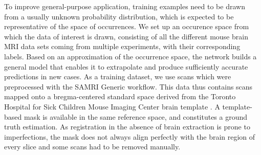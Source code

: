 To improve general-purpose application, training examples need to be drawn from a usually unknown probability distribution, which is expected to be representative of the space of occurrences.
We set up an occurence space from which the data of interest is drawn, consisting of all the different mouse brain MRI data sets coming from multiple experiments, with their corresponding labels.
Based on an approximation of the occurrence space, the network builds a general model that enables it to extrapolate and produce sufficiently accurate predictions in new cases.
As a training dataset, we use scans which were preprocessed with the SAMRI Generic workflow.
This data thus contains scans mapped onto a bregma-centered standard \cite{ioanas_optimized_2019} space derived from the Toronto Hospital for Sick Children Mouse Imaging Center brain template \cite{dsu}.
A template-based mask is available in the same reference space, and constitutes a ground truth estimation.
As registration in the absence of brain extraction is prone to imperfections, the mask does not always align perfectly with the brain region of every slice and some scans had to be removed manually.
